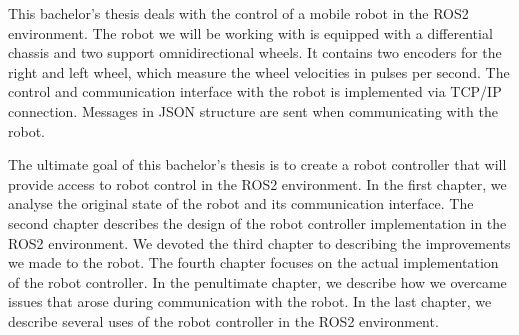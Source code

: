 This bachelor's thesis deals with the control of a mobile robot in the ROS2 environment. The robot we will
be working with is equipped with a differential chassis and two support omnidirectional wheels. It contains
two encoders for the right and left wheel, which measure the wheel velocities in pulses per second.
The control and communication interface with the robot is implemented via TCP/IP connection. Messages
in JSON structure are sent when communicating with the robot.

The ultimate goal of this bachelor's thesis is to create a robot controller that will provide access
to robot control in the ROS2 environment. In the first chapter, we analyse the original state
of the robot and its communication interface. The second chapter describes the design of the robot
controller implementation in the ROS2 environment. We devoted the third chapter to describing
the improvements we made to the robot. The fourth chapter focuses on the actual implementation
of the robot controller. In the penultimate chapter, we describe how we overcame issues that arose
during communication with the robot. In the last chapter, we describe several uses of the robot
controller in the ROS2 environment.
